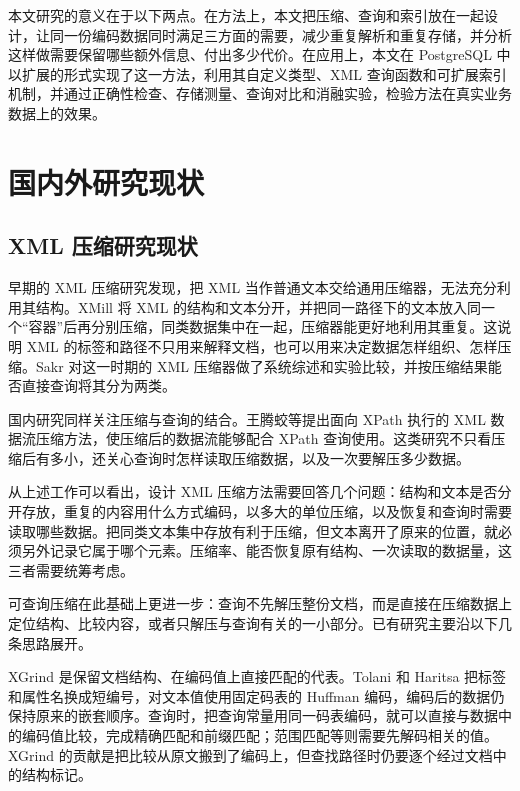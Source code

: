 本文研究的意义在于以下两点。在方法上，本文把压缩、查询和索引放在一起设计，让同一份编码数据同时满足三方面的需要，减少重复解析和重复存储，并分析这样做需要保留哪些额外信息、付出多少代价。在应用上，本文在 PostgreSQL 中以扩展的形式实现了这一方法，利用其自定义类型、XML 查询函数和可扩展索引机制\cite{pg16xmltype,pg16xmlfunc,pg16gin}，并通过正确性检查、存储测量、查询对比和消融实验，检验方法在真实业务数据上的效果。

\section{国内外研究现状}

\subsection{XML 压缩研究现状}

早期的 XML 压缩研究发现，把 XML 当作普通文本交给通用压缩器，无法充分利用其结构。XMill 将 XML 的结构和文本分开，并把同一路径下的文本放入同一个“容器”后再分别压缩，同类数据集中在一起，压缩器能更好地利用其重复\cite{liefke2000xmill}。这说明 XML 的标签和路径不只用来解释文档，也可以用来决定数据怎样组织、怎样压缩。Sakr 对这一时期的 XML 压缩器做了系统综述和实验比较，并按压缩结果能否直接查询将其分为两类\cite{sakr2009xml}。

国内研究同样关注压缩与查询的结合。王腾蛟等提出面向 XPath 执行的 XML 数据流压缩方法，使压缩后的数据流能够配合 XPath 查询使用\cite{wang2005xpath}。这类研究不只看压缩后有多小，还关心查询时怎样读取压缩数据，以及一次要解压多少数据。

从上述工作可以看出，设计 XML 压缩方法需要回答几个问题：结构和文本是否分开存放，重复的内容用什么方式编码，以多大的单位压缩，以及恢复和查询时需要读取哪些数据。把同类文本集中存放有利于压缩，但文本离开了原来的位置，就必须另外记录它属于哪个元素。压缩率、能否恢复原有结构、一次读取的数据量，这三者需要统筹考虑。

可查询压缩在此基础上更进一步：查询不先解压整份文档，而是直接在压缩数据上定位结构、比较内容，或者只解压与查询有关的一小部分。已有研究主要沿以下几条思路展开。

XGrind 是保留文档结构、在编码值上直接匹配的代表\cite{tolani2002xgrind}。Tolani 和 Haritsa 把标签和属性名换成短编号，对文本值使用固定码表的 Huffman 编码，编码后的数据仍保持原来的嵌套顺序。查询时，把查询常量用同一码表编码，就可以直接与数据中的编码值比较，完成精确匹配和前缀匹配；范围匹配等则需要先解码相关的值。XGrind 的贡献是把比较从原文搬到了编码上，但查找路径时仍要逐个经过文档中的结构标记。

